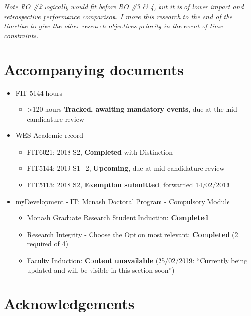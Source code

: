 \documentclass{monashthesis}
\begin{document}
\emph{Note RO \#2 logically would fit before RO \#3 \& 4, but it is of
lower impact and retrospective performance comparison. I move this
research to the end of the timeline to give the other research
objectives priority in the event of time constraints.}

\section{Accompanying documents}\label{accompanying-documents}

\begin{itemize}
\tightlist
\item
  FIT 5144 hours

  \begin{itemize}
  \tightlist
  \item
    \textgreater{}120 hours \textbf{Tracked, awaiting mandatory events},
    due at the mid-candidature review
  \end{itemize}
\item
  WES Academic record

  \begin{itemize}
  \tightlist
  \item
    FIT6021: 2018 S2, \textbf{Completed} with Distinction
  \item
    FIT5144: 2019 S1+2, \textbf{Upcoming}, due at mid-candidature review
  \item
    FIT5113: 2018 S2, \textbf{Exemption submitted}, forwarded 14/02/2019
  \end{itemize}
\item
  myDevelopment - IT: Monash Doctoral Program - Compulsory Module

  \begin{itemize}
  \tightlist
  \item
    Monash Graduate Research Student Induction: \textbf{Completed}
  \item
    Research Integrity - Choose the Option most relevant:
    \textbf{Completed} (2 required of 4)
  \item
    Faculty Induction: \textbf{Content unavailable} (25/02/2019:
    ``Currently being updated and will be visible in this section
    soon'')
  \end{itemize}
\end{itemize}

\section{Acknowledgements}\label{sec:source}
\end{document}
